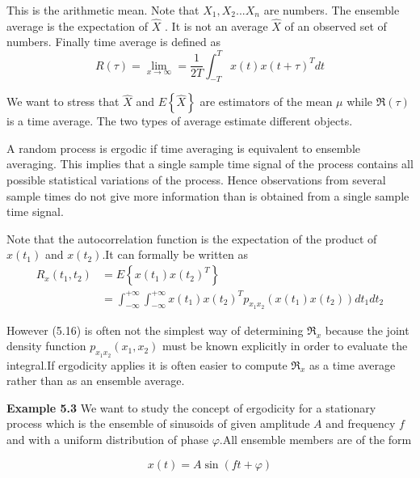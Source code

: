 	     This is the arithmetic mean. Note that $ X_{1},X_{2}...X_{n} $ are numbers. The ensemble average is the expectation of $\hat{X}$ . It is not an average $\hat{X}$ of an observed set of numbers. Finally time average is defined as 
	     \begin{equation}\label{5.15}
	     R(\tau) =\lim_{x\longrightarrow\infty}=\frac{1}{2T}\int_{-T}^{T}x(t)x(t+\tau)^{T}dt 
	     \end{equation}
	    
	     
	      We want to stress that $\hat{X}$  and $E\left\lbrace \hat{X}\right\rbrace $ are estimators of the mean $\mu$  while $\Re(\tau) $ is a time average. The two types of average estimate different objects. 
	     
	     A random process is ergodic if time averaging is equivalent to ensemble averaging. This implies that a single sample time signal of the process contains all possible statistical variations of the process. Hence observations from several sample times do not give more information than is obtained from a single sample time signal.
	     
	     Note that the autocorrelation function is the expectation of the product of  $x(t_{1})$ and  $x(t_{2})$.It can formally be written as
	     \begin{equation}\label{5.16}
	     \begin{aligned}
	     R_{x}(t_{1},t_{2})&=E\left\lbrace x(t_{1})x(t_{2})^{T}\right\rbrace\\
	     &=\int_{-\infty}^{+\infty}\int_{-\infty}^{+\infty} x(t_{1})x(t_{2})^{T}p_{x_{1}x_{2}}(x(t_{1})x(t_{2}))dt_{1}dt_{2}
	     \end{aligned}
	     \end{equation}
	     
	     
	      However (5.16) is often not the simplest way of determining $\Re_{x}$ because the joint density function $p_{x_{1}x_{2}}(x_{1},x_{2})$ must be known explicitly in order to evaluate the integral.If ergodicity applies it is often easier to compute $\Re_{x}$ as a time average rather than as an ensemble average.
	     
	      \textbf{Example 5.3} We want to study the concept of ergodicity for a stationary process which is the ensemble of sinusoids of given amplitude $A$ and frequency $f$  and with a uniform distribution of phase $\varphi$.All ensemble members are of the form 
	     
	      \[ x(t)=A\sin(ft+\varphi) \]
	     
